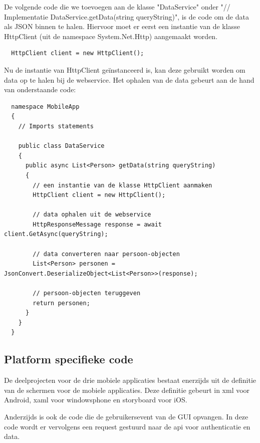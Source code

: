 De volgende code die we toevoegen aan de klasse "DataService" onder "// Implementatie DataService.getData(string queryString)", is de code om de data als JSON binnen te halen.
Hiervoor moet er eerst een instantie van de klasse HttpClient (uit de namespace System.Net.Http) aangemaakt worden.
\begin{lstlisting}
  HttpClient client = new HttpClient();
\end{lstlisting}
\newpage
Nu de instantie van HttpClient geïnstanceerd is, kan deze gebruikt worden om data op te halen bij de webservice.
Het ophalen van de data gebeurt aan de hand van onderstaande code:
\begin{lstlisting}
  namespace MobileApp
  {
    // Imports statements

    public class DataService
    {
      public async List<Person> getData(string queryString)
      {
        // een instantie van de klasse HttpClient aanmaken
        HttpClient client = new HttpClient();

        // data ophalen uit de webservice
        HttpResponseMessage response = await client.GetAsync(queryString);

        // data converteren naar persoon-objecten
        List<Person> personen = JsonConvert.DeserializeObject<List<Person>>(response);

        // persoon-objecten teruggeven
        return personen;
      }
    }
  }
\end{lstlisting}



\subsection{Platform specifieke code}
De deelprojecten voor de drie mobiele applicaties bestaat enerzijds uit de definitie van de schermen voor de mobiele applicaties.
Deze definitie gebeurt in xml voor Android, xaml voor windowsphone en storyboard voor iOS.

Anderzijds is ook de code die de gebruikersevent van de GUI opvangen. In deze code wordt er vervolgens een request gestuurd naar
de api voor authenticatie en data.
